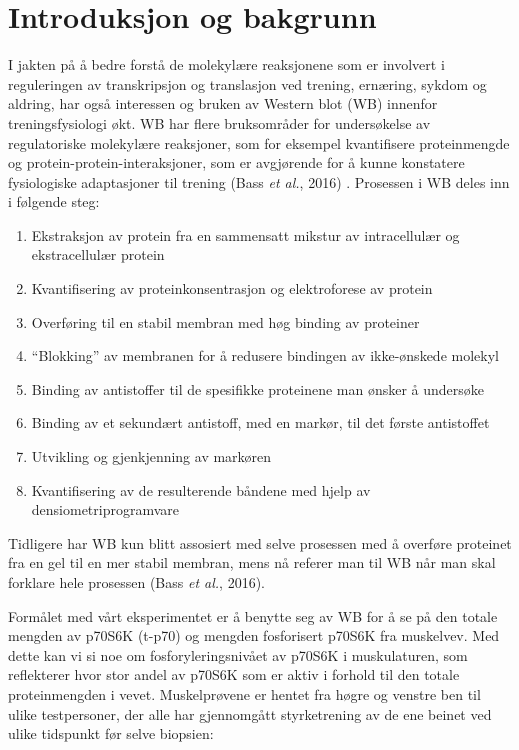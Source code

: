 \documentclass[
  letterpaper,
  DIV=11,
  numbers=noendperiod]{scrreprt}
\providecommand{\tightlist}{%
  \setlength{\itemsep}{0pt}\setlength{\parskip}{0pt}}\usepackage{longtable,booktabs,array}
\begin{document}
\section{Introduksjon og bakgrunn}\label{introduksjon-og-bakgrunn}

I jakten på å bedre forstå de molekylære reaksjonene som er involvert i
reguleringen av transkripsjon og translasjon ved trening, ernæring,
sykdom og aldring, har også interessen og bruken av Western blot (WB)
innenfor treningsfysiologi økt. WB har flere bruksområder for
undersøkelse av regulatoriske molekylære reaksjoner, som for eksempel
kvantifisere proteinmengde og protein-protein-interaksjoner, som er
avgjørende for å kunne konstatere fysiologiske adaptasjoner til trening
(Bass \emph{et al.}, 2016) . Prosessen i WB deles inn i følgende steg:

\begin{enumerate}
\def\labelenumi{\arabic{enumi})}
\tightlist
\item
  Ekstraksjon av protein fra en sammensatt mikstur av intracellulær og
  ekstracellulær protein
\item
  Kvantifisering av proteinkonsentrasjon og elektroforese av protein
\item
  Overføring til en stabil membran med høg binding av proteiner
\item
  ``Blokking'' av membranen for å redusere bindingen av ikke-ønskede
  molekyl
\item
  Binding av antistoffer til de spesifikke proteinene man ønsker å
  undersøke
\item
  Binding av et sekundært antistoff, med en markør, til det første
  antistoffet
\item
  Utvikling og gjenkjenning av markøren
\item
  Kvantifisering av de resulterende båndene med hjelp av
  densiometriprogramvare
\end{enumerate}

Tidligere har WB kun blitt assosiert med selve prosessen med å overføre
proteinet fra en gel til en mer stabil membran, mens nå referer man til
WB når man skal forklare hele prosessen (Bass \emph{et al.}, 2016).

Formålet med vårt eksperimentet er å benytte seg av WB for å se på den
totale mengden av p70S6K (t-p70) og mengden fosforisert p70S6K fra
muskelvev. Med dette kan vi si noe om fosforyleringsnivået av p70S6K i
muskulaturen, som reflekterer hvor stor andel av p70S6K som er aktiv i
forhold til den totale proteinmengden i vevet. Muskelprøvene er hentet
fra høgre og venstre ben til ulike testpersoner, der alle har
gjennomgått styrketrening av de ene beinet ved ulike tidspunkt før selve
biopsien:
\end{document}
